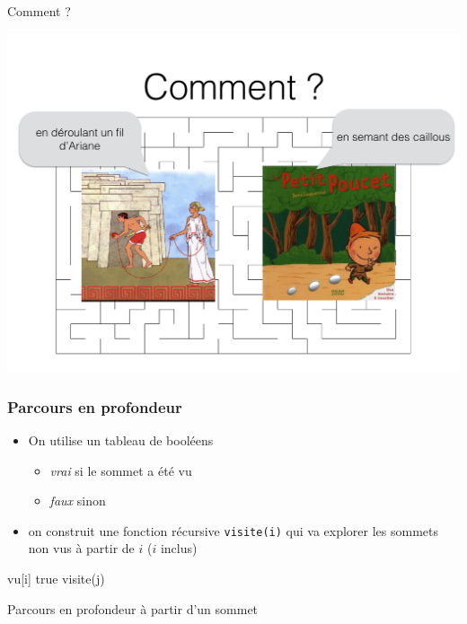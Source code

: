 \begin{frame}{Comment ?}
    \begin{center}
        \includegraphics[width=.75\textwidth]{fig/labyrinthe-3.pdf}
    \end{center}
\end{frame}

\begin{frame}[fragile]
\frametitle{Parcours en profondeur}
    \begin{itemize}
        \item On utilise un tableau de booléens 
        \begin{itemize}
            \item \emph{vrai} si le sommet a été vu 
            \item \emph{faux} sinon 
        \end{itemize}
        \item on construit une fonction récursive \texttt{visite(i)} qui va explorer les sommets non vus à partir de $i$ ($i$ inclus)
    \end{itemize}
    
    \begin{algorithm}[H]
        \begin{algorithmic}[1]
            \State vu[i] \gets true
                    \State visite(j)
                \EndIf
            \EndFor
            \EndFunction
         \end{algorithmic}
        \caption{Parcours en profondeur à partir d'un sommet}
        \label{alg:prof:visite}
        \end{algorithm}
\end{frame}

